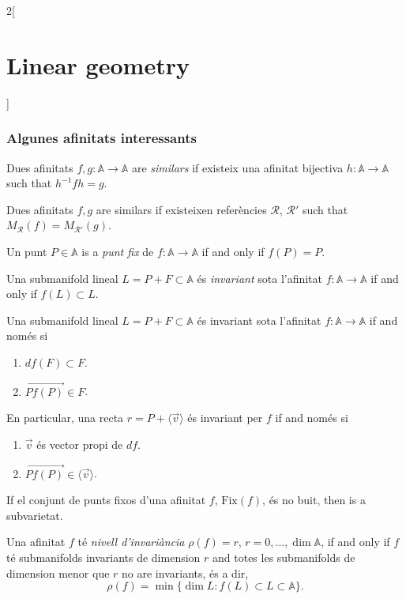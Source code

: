 \documentclass[class=article,10pt,crop=false]{standalone}
\begin{document}
\begin{multicols}{2}[\section{Linear geometry}]
\subsubsection{Algunes afinitats interessants}
\begin{definition}
Dues afinitats $f,g:\mathbb{A}\rightarrow\mathbb{A}$ are \textit{similars} if existeix una afinitat bijectiva $h:\mathbb{A}\rightarrow\mathbb{A}$ such that $h^{-1}fh=g$.
\end{definition}
\begin{prop}
Dues afinitats $f,g$ are similars if existeixen referències $\mathcal{R}$, $\mathcal{R}'$ such that $M_\mathcal{R}(f)=M_{\mathcal{R}'}(g)$.
\end{prop}
\begin{definition}
Un punt $P\in\mathbb{A}$ is a \textit{punt fix} de $f:\mathbb{A}\rightarrow\mathbb{A}$ if and only if $f(P)=P$.
\end{definition}
\begin{definition}
Una submanifold lineal $L=P+F\subset\mathbb{A}$ és \textit{invariant} sota l'afinitat $f:\mathbb{A}\rightarrow\mathbb{A}$ if and only if $f(L)\subset L$.
\end{definition}
\begin{prop}
Una submanifold lineal $L=P+F\subset\mathbb{A}$ és invariant sota l'afinitat $f:\mathbb{A}\rightarrow\mathbb{A}$ if and només si
\begin{enumerate}
    \item $df(F)\subset F$.
    \item $\overrightarrow{Pf(P)}\in F$.
\end{enumerate} En particular, una recta $r=P+\langle\overrightarrow{v}\rangle$ és invariant per $f$ if and només si
\begin{enumerate}
    \item $\overrightarrow{v}$ és vector propi de $df$.
    \item $\overrightarrow{Pf(P)}\in\langle\overrightarrow{v}\rangle$.
\end{enumerate}
\end{prop}
\begin{prop}
If el conjunt de punts fixos d'una afinitat $f$, $\text{Fix}(f)$, és no buit, then is a subvarietat.
\end{prop}
\begin{definition}
Una afinitat $f$ té \textit{nivell d'invariància} $\rho(f)=r$, $r=0,\ldots,\dim\mathbb{A}$, if and only if $f$ té submanifolds invariants de dimension $r$ and totes les submanifolds de dimension menor que $r$ no are invariants, és a dir, $$\rho(f)=\min\{\dim L:f(L)\subset L\subset\mathbb{A}\}.$$  

\end{definition}
\end{multicols}
\end{document}
